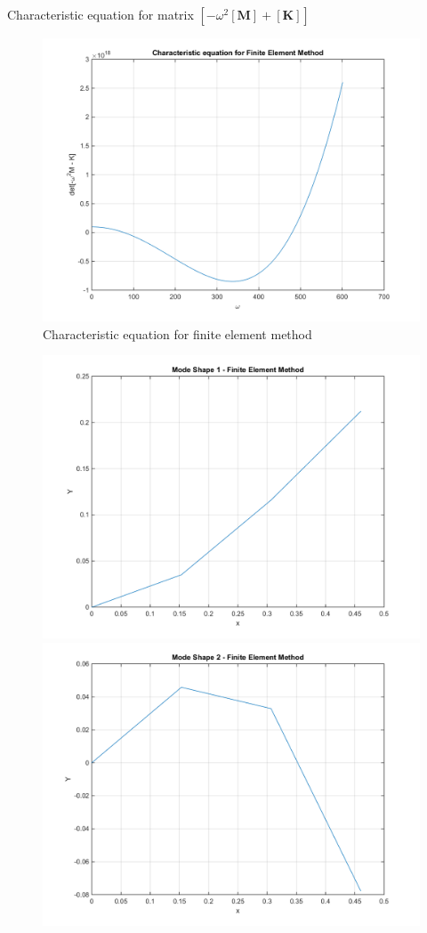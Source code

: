 \documentclass[14pt,a4paper]{article}
\begin{document}
\begin{enumerate}
	Characteristic equation for matrix $\left[-\omega^2[\textbf{M}] + [\textbf{K}]\right]$
	\begin{figure}[htp]
		\centering
		\includegraphics[scale=0.5]{fn2_VB2_1.png}
		\caption{Characteristic equation for finite element method}
	\end{figure}
	\begin{figure}[htp]
		\centering
		\includegraphics[scale=0.4]{fn2_VB2_3.png}
		\includegraphics[scale=0.4]{fn2_VB2_4.png}

\end{figure}
\end{enumerate}
\end{document}
